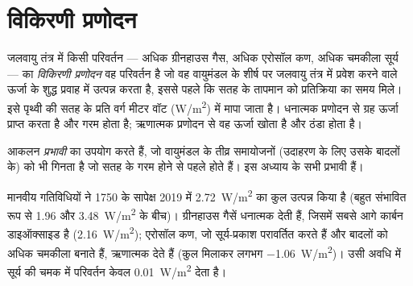 \section{विकिरणी प्रणोदन}

\begin{definition}[विकिरणी प्रणोदन]\label{def:g12:climate-change:forcing}
जलवायु तंत्र में किसी परिवर्तन --- अधिक ग्रीनहाउस गैस, अधिक एरोसॉल कण, अधिक चमकीला
सूर्य --- का \emph{विकिरणी प्रणोदन} वह परिवर्तन है जो वह
वायुमंडल के शीर्ष पर जलवायु तंत्र में प्रवेश करने वाले ऊर्जा के शुद्ध प्रवाह में उत्पन्न करता है,
इससे पहले कि सतह के तापमान को प्रतिक्रिया का समय मिले। इसे पृथ्वी की सतह के प्रति वर्ग मीटर
वॉट (\unit{W/m^2}) में मापा जाता है। धनात्मक प्रणोदन से ग्रह
ऊर्जा प्राप्त करता है और गरम होता है; ऋणात्मक प्रणोदन से वह ऊर्जा खोता है और ठंडा होता है।
\end{definition}

\begin{remark}[प्रभावी प्रणोदन]\label{rem:g12:climate-change:effective}
आकलन \emph{प्रभावी}  का उपयोग करते हैं, जो वायुमंडल
के तीव्र समायोजनों (उदाहरण के लिए उसके बादलों के) को भी गिनता है
जो सतह के गरम होने से पहले होते हैं। इस अध्याय के सभी 
प्रभावी  हैं।
\end{remark}

\begin{proposition}[1750 से प्रणोदन]\label{prop:g12:climate-change:forcing}
मानवीय गतिविधियों ने 1750 के सापेक्ष 2019 में
\qty{2.72}{W/m^2} का कुल  उत्पन्न किया है (बहुत संभावित रूप से 1.96 और
\qty{3.48}{W/m^2} के बीच)। ग्रीनहाउस गैसें धनात्मक  देती हैं, जिसमें सबसे आगे
कार्बन डाइऑक्साइड है (\qty{2.16}{W/m^2}); एरोसॉल कण, जो
सूर्य-प्रकाश परावर्तित करते हैं और बादलों को अधिक चमकीला बनाते हैं, ऋणात्मक  देते हैं (कुल मिलाकर लगभग
\qty{-1.06}{W/m^2})। उसी अवधि में सूर्य की चमक में परिवर्तन
केवल \qty{0.01}{W/m^2} देता है।
\end{proposition}

